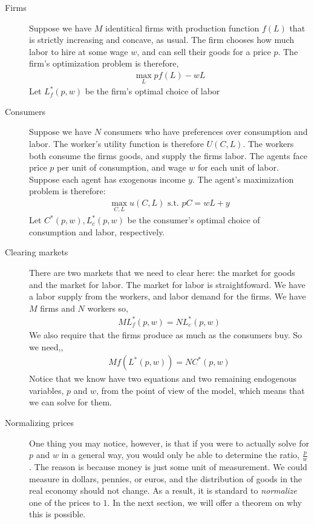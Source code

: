 \begin{description}
    \item[Firms] Suppose we have $M$ identitical firms with production function $f(L)$ that is strictly increasing and concave, as usual. The firm chooses how much labor to hire at some wage $w$, and can sell their goods for a price $p$. The firm's optimization problem is therefore,
    \begin{align*}
        \max_{L} p f(L) - wL
    \end{align*}  
    Let $L_{f}^*(p, w)$ be the firm's optimal choice of labor
    \item[Consumers] Suppose we have $N$ consumers who have preferences over consumption and labor. The worker's utility function is therefore $U(C, L)$. The workers both consume the firms goods, and supply the firms labor. The agents face price $p$ per unit of consumption, and wage $w$ for each unit of labor. Suppose each agent has exogenous income $y$. The agent's maximization problem is therefore:
    \begin{align*}
        \max_{C, L} u(C, L) \text{ s.t. } pC = wL + y
    \end{align*} 
    Let $C^*(p, w), L_{c}^*(p, w)$ be the consumer's optimal choice of consumption and labor, respectively. 
    \item[Clearing markets] There are two markets that we need to clear here: the market for goods and the market for labor. The market for labor is straightfoward. We have a labor supply from the workers, and labor demand for the firms. We have $M$ firms and $N$ workers so, 
    \begin{align*}
        M L_{f}^*(p, w) = N L_{c}^*(p, w)
    \end{align*} 
    We also require that the firms produce as much as the consumers buy. So we need,,
    \begin{align*}
        M f(L^*(p, w)) = N C^*(p, w)
    \end{align*}
    Notice that we know have two equations and two remaining endogenous variables, $p$ and $w$, from the point of view of the model, which means that we can solve for them.
    \item[Normalizing prices] One thing you may notice, however, is that if you were to actually solve for $p$ and $w$ in a general way, you would only be able to determine the ratio, $\frac{p}{w}$. The reason is because money is just some unit of measurement. We could measure in dollars, pennies, or euros, and the distribution of goods in the real economy should not change. As a result, it is standard to \emph{normalize} one of the prices to $1$. In the next section, we will offer a theorem on why this is possible. 
\end{description}

